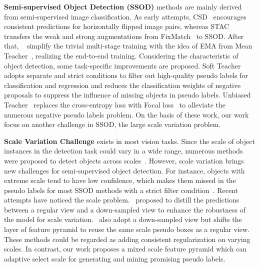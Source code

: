 \documentclass[10pt,twocolumn,letterpaper]{article}
\begin{document}
\vspace{.5em}
\noindent \textbf{Semi-supervised Object Detection (SSOD)} methods are mainly derived from semi-supervised image classification. As early attempts, CSD~\cite{CSD} encourages consistent predictions for horizontally flipped image pairs, whereas STAC~\cite{STAC} transfers the weak and strong augmentations from FixMatch~\cite{Fixmatch} to SSOD. After that, ~\cite{instantTeaching,humbleTeacher,ISMT,softTeacher} simplify the trivial multi-stage training with the idea of EMA from Mean Teacher~\cite{MeanTeacher}, realizing the end-to-end training. Considering the characteristic of object detection, some task-specific improvements are proposed. Soft Teacher~\cite{softTeacher} adopts separate and strict conditions to filter out high-quality pseudo labels for classification and regression and reduces the classification weights of negative proposals to suppress the influence of missing objects in pseudo labels. Unbiased Teacher~\cite{unbiasedTeacher} replaces the cross-entropy loss with Focal loss~\cite{focal} to alleviate the numerous negative pseudo labels problem. On the basis of these work, our work focus on another challenge in SSOD, \ie the large scale variation problem. 

\vspace{0em}
\noindent \textbf{Scale Variation Challenge} exists in most vision tasks. Since the scale of object instances in the detection task could vary in a wide range, numerous methods were proposed to detect objects across scales~\cite{fpn,trident,snip}. 
However, scale variation brings new challenges for semi-supervised object detection. For instance, objects with extreme scale tend to have low confidence, which makes them missed in the pseudo labels for most SSOD methods with a strict filter condition~\cite{STAC, softTeacher}. Recent attempts have noticed the scale problem.~\cite{sed} proposed to distill the predictions between a regular view and a down-sampled view to enhance the robustness of the model for scale variation.~\cite{pseco} also adopt a down-sampled view but shifts the layer of feature pyramid to reuse the same scale pseudo boxes as a regular view. These methods could be regarded as adding consistent regularization on varying scales. In contrast, our work proposes a mixed scale feature pyramid which can adaptive select scale for generating and mining promising pseudo labels. 
\end{document}
